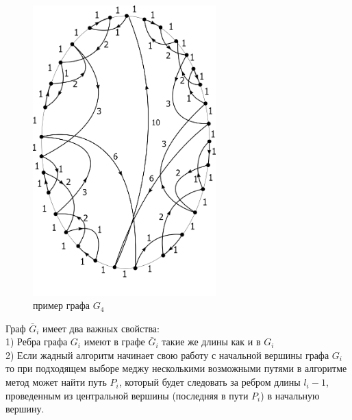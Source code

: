 \documentclass[a4paper, 14pt]{extarticle}
\numberwithin{equation}{section}
\begin{document}
\begin{figure}[h!]
\begin{center}
\includegraphics[width=200pt]{ris2.png}
\caption{пример графа $G_4$}
\label{fig:g4example}
\end{center}
\end{figure}

Граф $\bar G_i$ имеет два важных свойства:\\
1) Ребра графа $G_i$ имеют в графе $\bar G_i$ такие же длины как и в $G_i$ \\
2) Если жадный алгоритм начинает свою работу с начальной вершины графа  $G_i$ то при подходящем выборе меджу несколькими возможными путями в алгоритме метод может найти путь $P_i$, который будет следовать за ребром длины $l_i-1$, проведенным из центральной вершины (последняя в пути $P_i$) в начальную вершину.
\end{document}
